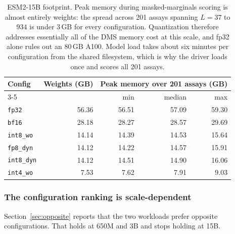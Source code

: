 \documentclass[11pt]{article}
\newcommand{\cfg}[1]{\texttt{#1}}
\begin{document}
\begin{table}[htb]
\centering
\caption{ESM2-15B footprint. Peak memory during masked-marginals scoring is
almost entirely weights: the spread across 201 assays spanning $L = 37$ to $934$
is under $3$\,GB for every configuration. Quantization therefore addresses
essentially all of the DMS memory cost at this scale, and fp32 alone rules out
an 80\,GB A100. Model load takes about six minutes per configuration from the
shared filesystem, which is why the driver loads once and scores all 201 assays.}
\label{tab:res15b}
\small
\begin{tabular}{lrrrr}
\toprule
Config & Weights (GB) & \multicolumn{3}{c}{Peak memory over 201 assays (GB)} \\
\cmidrule(lr){3-5}
       &              & min & median & max \\
\midrule
\cfg{fp32}      & 56.36 & 56.51 & 57.09 & 59.30 \\
\cfg{bf16}      & 28.18 & 28.27 & 28.57 & 29.69 \\
\cfg{int8\_wo}  & 14.14 & 14.39 & 14.53 & 15.64 \\
\cfg{fp8\_dyn}  & 14.12 & 14.22 & 14.57 & 15.91 \\
\cfg{int8\_dyn} & 14.12 & 14.51 & 14.90 & 16.06 \\
\cfg{int4\_wo}  &  7.53 &  7.62 &  7.91 &  9.03 \\
\bottomrule
\end{tabular}
\end{table}

\subsubsection{The configuration ranking is scale-dependent}

Section~\ref{sec:opposite} reports that the two workloads prefer opposite
configurations. That holds at 650M and 3B and stops holding at 15B.
\end{document}
